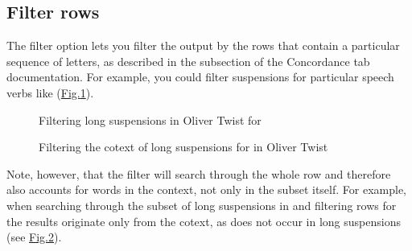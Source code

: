 \documentclass[letterpaper,10pt,english]{sphinxmanual}
\begin{document}
\subsection{Filter rows}
\label{\detokenize{clicanalysis/subsets:filter-rows}}
\sphinxAtStartPar
The filter option lets you filter the output by the rows that contain a
particular sequence of letters, as described in the {\hyperref[\detokenize{clicanalysis/subsets:filter-rows}]{}}
subsection of the Concordance tab documentation. For example, you could filter
suspensions for particular speech verbs like 
(\hyperref[\detokenize{clicanalysis/subsets:figure-analysis-subsets-results-filter-cried}]{Fig.\@ \ref{\detokenize{clicanalysis/subsets:figure-analysis-subsets-results-filter-cried}}}).

\begin{figure}[htbp]
\centering
\capstart

\noindent{}
\caption{Filtering long suspensions in Oliver Twist for }\label{\detokenize{clicanalysis/subsets:id4}}\label{\detokenize{clicanalysis/subsets:figure-analysis-subsets-results-filter-cried}}\end{figure}

\begin{figure}[htbp]
\centering
\capstart

\noindent{}
\caption{Filtering the co\sphinxhyphen{}text of long suspensions for  in
Oliver Twist}\label{\detokenize{clicanalysis/subsets:id5}}\label{\detokenize{clicanalysis/subsets:figure-analysis-subsets-results-filter-cotext}}\end{figure}

\sphinxAtStartPar
Note, however, that the filter will search through the whole row and
therefore also accounts for words in the context, not only in the subset
itself. For example, when searching through the subset of long
suspensions in  and filtering rows for  the
results originate only from the co\sphinxhyphen{}text, as  does not occur in
long suspensions (see \hyperref[\detokenize{clicanalysis/subsets:figure-analysis-subsets-results-filter-cotext}]{Fig.\@ \ref{\detokenize{clicanalysis/subsets:figure-analysis-subsets-results-filter-cotext}}}).
\end{document}
